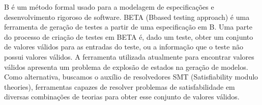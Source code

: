 B é um método formal usado para a modelagem de especificações e desenvolvimento rigoroso de software. BETA (Bbased testing approach) é uma ferramenta de geração de testes a partir de uma especificação em B. Uma parte do processo de criação de testes em BETA é, dado um teste, obter um conjunto de valores válidos para as entradas do teste, ou a informação que o teste não possui valores válidos. A ferramenta utilizada atualmente para encontrar valores válidos apresenta um problema de explosão de estados na geração de modelos. Como alternativa, buscamos o auxílio de resolvedores SMT (Satisfiability modulo theories), ferramentas capazes de resolver problemas de satisfabilidade em diversas combinações de teorias para obter esse conjunto de valores válidos.